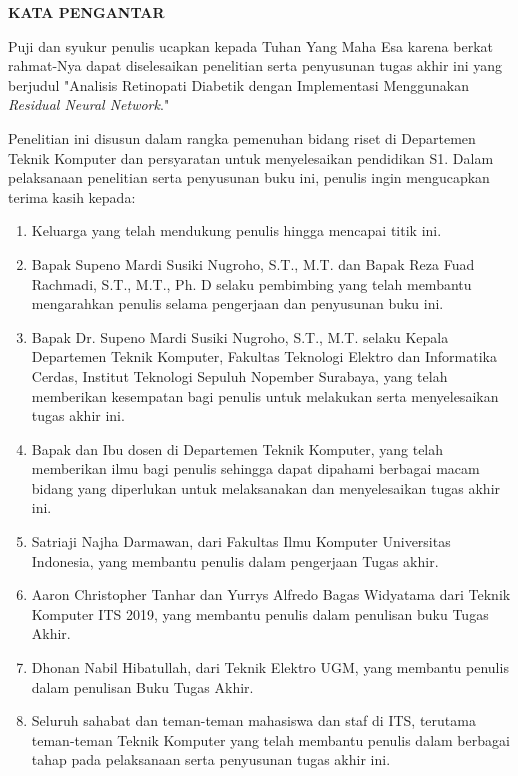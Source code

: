 \begin{center}
  \Large
  \textbf{KATA PENGANTAR}
\end{center}


\vspace{2ex}


Puji dan syukur penulis ucapkan kepada Tuhan Yang Maha Esa karena berkat rahmat-Nya dapat diselesaikan penelitian serta penyusunan tugas akhir ini yang berjudul "Analisis Retinopati Diabetik dengan Implementasi Menggunakan \emph{Residual Neural Network}."

Penelitian ini disusun dalam rangka pemenuhan bidang riset di Departemen Teknik Komputer dan persyaratan untuk menyelesaikan pendidikan S1. Dalam pelaksanaan penelitian serta penyusunan buku ini, penulis ingin mengucapkan terima kasih kepada:

\begin{enumerate}[nolistsep]

  \item Keluarga yang telah mendukung penulis hingga mencapai titik ini.

  \item Bapak Supeno Mardi Susiki Nugroho, S.T., M.T. dan Bapak Reza Fuad Rachmadi, S.T., M.T., Ph. D selaku pembimbing yang telah membantu mengarahkan penulis selama pengerjaan dan penyusunan buku ini. 

  \item Bapak Dr. Supeno Mardi Susiki Nugroho, S.T., M.T. selaku Kepala Departemen Teknik Komputer, Fakultas Teknologi Elektro dan Informatika Cerdas, Institut Teknologi Sepuluh Nopember Surabaya, yang telah memberikan kesempatan bagi penulis untuk melakukan serta menyelesaikan tugas akhir ini.
  
  \item Bapak dan Ibu dosen di Departemen Teknik Komputer, yang telah memberikan ilmu bagi penulis sehingga dapat dipahami berbagai macam bidang yang diperlukan untuk melaksanakan dan menyelesaikan tugas akhir ini.

  \item Satriaji Najha Darmawan, dari Fakultas Ilmu Komputer Universitas Indonesia, yang membantu penulis dalam pengerjaan Tugas akhir.
  
  \item Aaron Christopher Tanhar dan Yurrys Alfredo Bagas Widyatama dari Teknik Komputer ITS 2019, yang membantu penulis dalam penulisan buku Tugas Akhir.
  
  \item Dhonan Nabil Hibatullah, dari Teknik Elektro UGM, yang membantu penulis dalam penulisan Buku Tugas Akhir.

  \item Seluruh sahabat dan teman-teman mahasiswa dan staf di ITS, terutama teman-teman Teknik Komputer yang telah membantu penulis dalam berbagai tahap pada pelaksanaan serta penyusunan tugas akhir ini.

\end{enumerate}

